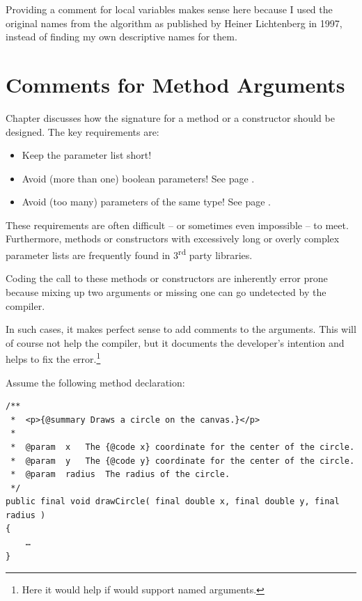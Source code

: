 Providing a comment for local variables makes sense here because I used the original names from the algorithm as published by Heiner Lichtenberg in 1997, instead of finding my own descriptive names for them.


\section{Comments for Method Arguments}\label{sec:MethodArgumentComments}
Chapter  discusses how the signature for a method or a constructor should be designed. The key requirements are:
\begin{itemize}[nosep]
	\item{Keep the parameter list short!}
	\item{Avoid (more than one) boolean parameters! See page \pageref{sec:BooleanArguments}.}
	\item{Avoid (too many) parameters of the same type! See page \pageref{sec:MultipleSameTypeArgs}.}
\end{itemize}

These requirements are often difficult – or sometimes even impossible – to meet. Furthermore, methods or constructors with excessively long or overly complex parameter lists are frequently found in 3\textsuperscript{rd} party libraries.

Coding the call to these methods or constructors are inherently error prone because mixing up two arguments or missing one can go undetected by the compiler.

In such cases, it makes perfect sense to add comments to the arguments. This will of course not help the compiler, but it documents the developer's intention and helps to fix the error.\footnote{Here it would help if \Java would support named arguments.}

Assume the following method declaration:
\begin{lstlisting}
/**
 *  <p>{@summary Draws a circle on the canvas.}</p>
 *
 *  @param  x   The {@code x} coordinate for the center of the circle.
 *  @param  y   The {@code y} coordinate for the center of the circle.
 *  @param  radius  The radius of the circle.
 */
public final void drawCircle( final double x, final double y, final radius )
{
    …
}
\end{lstlisting}

